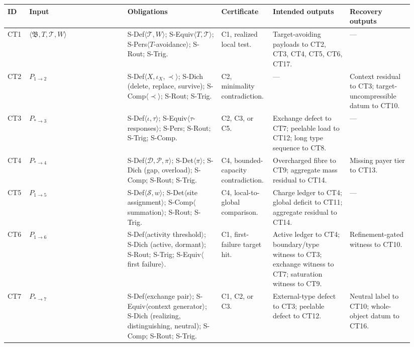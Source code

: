 \documentclass[
  11pt,
]{article}
\theoremstyle{definition}
\begin{document}
\begingroup
\tiny
\setlength{\tabcolsep}{0.8pt}
\begin{longtable}[]{@{}
  >{\raggedright\arraybackslash}p{0.055\linewidth}
  >{\raggedright\arraybackslash}p{0.23\linewidth}
  >{\raggedright\arraybackslash}p{0.22\linewidth}
  >{\raggedright\arraybackslash}p{0.10\linewidth}
  >{\raggedright\arraybackslash}p{0.18\linewidth}
  >{\raggedright\arraybackslash}p{0.15\linewidth}@{}}
\toprule\noalign{}
ID & Input & Obligations & Certificate & Intended outputs & Recovery outputs \\
\midrule\noalign{}
\endhead
\bottomrule\noalign{}
\endlastfoot
CT1 & \(\langle\mathfrak B,T,\mathcal T,W\rangle\) & S-Def\(\langle\mathcal T,W\rangle\); S-Equiv\(\langle T,\mathcal T\rangle\); S-Pers\(\langle T\)-avoidance\(\rangle\); S-Rout; S-Trig. & C1, realized local test. & Target-avoiding payloads to CT2, CT3, CT4, CT5, CT6, CT17. & --- \\
CT2 & \(P_{1\to2}\) & S-Def\(\langle X,\iota_X,\prec\rangle\); S-Dich (delete, replace, survive); S-Comp\(\langle\prec\rangle\); S-Rout; S-Trig. & C2, minimality contradiction. & --- & Context residual to CT3; target-uncompressible datum to CT10. \\
CT3 & \(P_{\ast\to3}\) & S-Def\(\langle\iota,\tau\rangle\); S-Equiv\(\langle\tau\)-responses\(\rangle\); S-Pers; S-Rout; S-Trig; S-Comp. & C2, C3, or C5. & Exchange defect to CT7; peelable load to CT12; long type sequence to CT8. & --- \\
CT4 & \(P_{\ast\to4}\) & S-Def\(\langle\mathcal D,\mathcal P,\pi\rangle\); S-Det\(\langle\pi\rangle\); S-Dich (gap, overload); S-Comp; S-Rout; S-Trig. & C4, bounded-capacity contradiction. & Overcharged fibre to CT9; aggregate mass residual to CT14. & Missing payer tier to CT13. \\
CT5 & \(P_{1\to5}\) & S-Def\(\langle\mathcal S,w\rangle\); S-Det\(\langle\)site assignment\(\rangle\); S-Comp\(\langle\)summation\(\rangle\); S-Rout; S-Trig. & C4, local-to-global comparison. & Charge ledger to CT4; global deficit to CT11; aggregate residual to CT14. & --- \\
CT6 & \(P_{1\to6}\) & S-Def\(\langle\)activity threshold\(\rangle\); S-Dich (active, dormant); S-Rout; S-Trig; S-Equiv\(\langle\)first failure\(\rangle\). & C1, first-failure target hit. & Active ledger to CT4; boundary/type witness to CT3; exchange witness to CT7; saturation witness to CT9. & Refinement-gated witness to CT10. \\
CT7 & \(P_{\ast\to7}\) & S-Def\(\langle\)exchange pair\(\rangle\); S-Equiv\(\langle\)context generator\(\rangle\); S-Dich (realizing, distinguishing, neutral); S-Comp; S-Rout; S-Trig. & C1, C2, or C3. & External-type defect to CT3; peelable defect to CT12. & Neutral label to CT10; whole-object datum to CT16. \\

\end{longtable}
\end{document}
